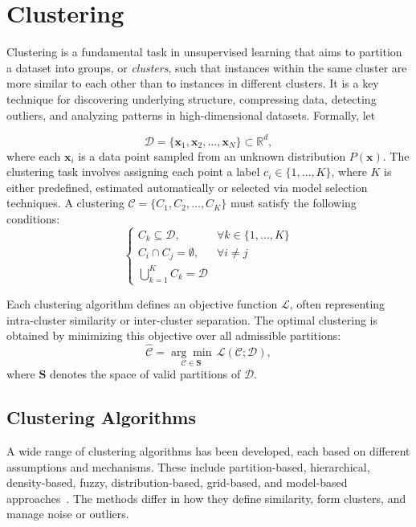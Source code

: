 \section{Clustering}\label{sec:clustering}

Clustering is a fundamental task in unsupervised learning that aims to
partition a dataset into groups, or \textit{clusters}, such that instances
within the same cluster are more similar to each other than to instances in
different clusters. It is a key technique for discovering underlying structure,
compressing data, detecting outliers, and analyzing patterns in
high-dimensional datasets. Formally, let

\begin{equation}
    \mathcal{D} = \{\mathbf{x}_1, \mathbf{x}_2, \ldots, \mathbf{x}_N\} \subset \mathbb{R}^d,
\end{equation}
where each $\mathbf{x}_i$ is a data point sampled from an unknown distribution
$P(\mathbf{x})$. The clustering task involves assigning each point a label $c_i
    \in \{1, \ldots, K\}$, where $K$ is either predefined, estimated automatically
or selected via model selection techniques.
A clustering $\mathcal{C} = \{C_1, C_2, \ldots, C_K\}$
must satisfy the following conditions:
\begin{equation}
    \begin{cases}
        C_k \subseteq \mathcal{D}, & \forall k \in \{1, \ldots, K\} \\
        C_i \cap C_j = \emptyset,  & \forall i \neq j               \\
        \bigcup_{k=1}^{K} C_k = \mathcal{D}
    \end{cases}
\end{equation}

Each clustering algorithm defines an objective function $\mathcal{L}$, often
representing intra-cluster similarity or inter-cluster separation. The optimal
clustering is obtained by minimizing this objective over all admissible
partitions:
\begin{equation}
    \hat{\mathcal{C}} = \underset{\mathcal{C} \in \mathbf{S}}{\arg\min} \, \mathcal{L}(\mathcal{C}; \mathcal{D}),
\end{equation}
where $\mathbf{S}$ denotes the space of valid partitions of $\mathcal{D}$.

\subsection{Clustering Algorithms}
A wide range of clustering algorithms has been developed, each based on
different assumptions and mechanisms. These include partition-based,
hierarchical, density-based, fuzzy, distribution-based, grid-based, and
model-based approaches~\cite{clustering_survey}. The methods differ in how they
define similarity, form clusters, and manage noise or outliers.

